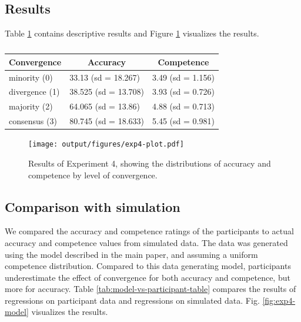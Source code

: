\documentclass[
  doc,floatsintext]{apa6}
\begin{document}
\subsection{Results}\label{results-3}

Table \ref{tab:exp4-table} contains descriptive results and Figure \ref{fig:exp4-plot} visualizes the results.

\begin{table}[tbp]

\begin{center}
\begin{threeparttable}

\caption{\label{tab:exp4-table}}

\begin{tabular}{lll}
\toprule
Convergence & \multicolumn{1}{c}{Accuracy} & \multicolumn{1}{c}{Competence}\\
\midrule
minority (0) & 33.13 (sd = 18.267) & 3.49 (sd = 1.156)\\
divergence (1) & 38.525 (sd = 13.708) & 3.93 (sd = 0.726)\\
majority (2) & 64.065 (sd = 13.86) & 4.88 (sd = 0.713)\\
consensus (3) & 80.745 (sd = 18.633) & 5.45 (sd = 0.981)\\
\bottomrule
\end{tabular}

\end{threeparttable}
\end{center}

\end{table}



\begin{figure}
\centering
\texttt{[image: output/figures/exp4-plot.pdf]}
\caption{\label{fig:exp4-plot}Results of Experiment 4, showing the distributions of accuracy and competence by level of convergence.}
\end{figure}

\subsection{Comparison with simulation}\label{comparison-with-simulation}

We compared the accuracy and competence ratings of the participants to actual accuracy and competence values from simulated data. The data was generated using the model described in the main paper, and assuming a uniform competence distribution. Compared to this data generating model, participants underestimate the effect of convergence for both accuracy and competence, but more for accuracy. Table \ref{tab:model-vs-participant-table} compares the results of regressions on participant data and regressions on simulated data. Fig. \ref{fig:exp4-model} visualizes the results.
\end{document}
